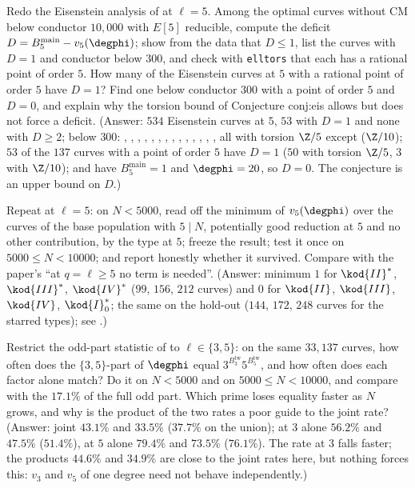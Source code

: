 \begin{sloppypar}
\begin{exercise}\label{exer:computation:eis}
Redo the Eisenstein analysis of  at $\ell=5$. Among the optimal curves without CM below conductor $10{,}000$ with $E[5]$ reducible,
compute the deficit $D=B^{\mathrm{main}}_5-v_5(\degphi)$; show from the data that $D\le1$, list the curves with $D=1$ and conductor below $300$, and check with
\texttt{elltors} that each has a rational point of order $5$. How many of the Eisenstein curves at $5$ with a rational point of order $5$ have $D=1$? Find one
below conductor $300$ with a point of order $5$ and $D=0$, and explain why the torsion bound of Conjecture conj:eis allows but does not force a deficit.
(Answer: $534$ Eisenstein curves at $5$, $53$ with $D=1$ and none with $D\ge2$; below $300$: , , , , ,
, , , , , , , , , all with torsion $\Z/5$ except
 ($\Z/10$); $53$ of the $137$ curves with a point of order $5$ have $D=1$ ($50$ with torsion $\Z/5$, $3$ with $\Z/10$);  and 
have $B^{\mathrm{main}}_5=1$ and $\degphi=20$, so $D=0$. The conjecture is an upper bound on $D$.)
\end{exercise}

\begin{exercise}[the protocol at $\ell=5$]\label{exer:computation:toy5}
Repeat  at $\ell=5$: on $N<5000$, read off the minimum of $v_5(\degphi)$ over the curves of the base population with $5\mid N$,
potentially good reduction at $5$ and no other contribution, by the type at $5$; freeze the result; test it once on $5000\le N<10000$; and report honestly
whether it survived. Compare with the paper's ``at $q=\ell\ge5$ no term is needed''. (Answer: minimum $1$ for $\kod{II}^*$, $\kod{III}^*$, $\kod{IV}^*$ ($99$, $156$, $212$ curves) and
$0$ for $\kod{II}$, $\kod{III}$, $\kod{IV}$, $\kod{I}_0^*$; the same on the hold-out ($144$, $172$, $248$ curves for the starred types); see .)
\end{exercise}

\begin{exercise}\label{exer:computation:oddpart}
Restrict the odd-part statistic of  to $\ell\in\{3,5\}$: on the same $33{,}137$ curves, how often does the $\{3,5\}$-part of $\degphi$ equal
$3^{B^{\mathrm{tw}}_3}5^{B^{\mathrm{tw}}_5}$, and how often does each factor alone match? Do it on $N<5000$ and on $5000\le N<10000$, and compare with the $17.1\%$ of the full
odd part. Which prime loses equality faster as $N$ grows, and why is the product of the two rates a poor guide to the joint rate? (Answer: joint
$43.1\%$ and $33.5\%$ ($37.7\%$ on the union); at $3$ alone $56.2\%$ and $47.5\%$ ($51.4\%$), at $5$ alone $79.4\%$ and $73.5\%$ ($76.1\%$). The rate at $3$ falls faster;
the products $44.6\%$ and $34.9\%$ are close to the joint rates here, but nothing forces this: $v_3$ and $v_5$ of one degree need not behave independently.)
\end{exercise}


\end{sloppypar}
